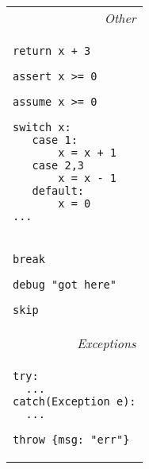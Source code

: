 \documentclass[a4paper,10pt,twcolumn]{article}
\begin{document}
\begin{tabular}{l}
\multicolumn{1}{r}{\em Other}\\
\begin{minipage}[t]{3cm}
\begin{lstlisting}
return x + 3
\end{lstlisting}
\begin{lstlisting}
assert x >= 0
\end{lstlisting}
\begin{lstlisting}
assume x >= 0
\end{lstlisting}
\end{minipage}
\hspace*{0.25cm}
\begin{minipage}[t]{3.75cm}
\begin{lstlisting}
switch x:
   case 1:
       x = x + 1
   case 2,3
       x = x - 1
   default:
       x = 0
...
\end{lstlisting}
\end{minipage}\\
\begin{minipage}[t]{1.5cm}
\begin{lstlisting}
break
\end{lstlisting}
\end{minipage}
\hspace*{0.25cm}
\begin{minipage}[t]{3.5cm}
\begin{lstlisting}
debug "got here"
\end{lstlisting}
\end{minipage}
\hspace*{0.25cm}
\begin{minipage}[t]{1.5cm}
\begin{lstlisting}
skip
\end{lstlisting}
\end{minipage}
\\
\multicolumn{1}{r}{\em Exceptions}\\
\begin{minipage}[t]{4.25cm}
\begin{lstlisting}
try:
  ...
catch(Exception e):
  ...
\end{lstlisting}
\end{minipage}
\hspace*{0.25cm}
\begin{minipage}[t]{4cm}
\begin{lstlisting}
throw {msg: "err"}
\end{lstlisting}
\end{minipage}

\end{tabular}
\newpage
\end{document}
